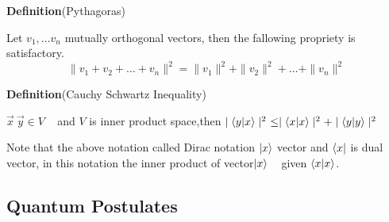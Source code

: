 \textbf{Definition}{(Pythagoras)}

Let $v_1,\dots v_n$ mutually orthogonal vectors, then the fallowing propriety  is satisfactory.
$$\parallel v_1+v_2+\dots+v_n\parallel^2=\parallel v_1\parallel^2+\parallel v_2\parallel^2+\dots +\parallel v_n\parallel^2$$

\textbf{Definition}{(Cauchy Schwartz Inequality)}

$\vec{x} ~\vec{y} \in V $ ~ and $V$ is inner product space,then $\mid \bra{y} \ket{x} \mid^2~\leq \mid \bra{x} \ket{x} \mid^2+\mid \bra{y} \ket{y} \mid^2$

Note that the above notation called Dirac notation $\ket{x}$ vector and $\bra{x}$ is dual vector, in this notation the inner product of vector$\ket{x}$ ~ given $\bra{x}\ket{x}$.
\subsection{Quantum Postulates}


